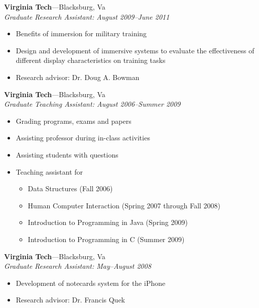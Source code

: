 \documentclass[wideaddress]{vitae}
\newcommand{\ressubitem}[1]{
	\item \begin{flushleft} #1 \end{flushleft}
}
\newcommand{\resbigitem}[3]{
	\item
	\textbf{#1}---#2 \\
	\textit{#3}
}
\newenvironment{ressubsec}[3]{
	\resbigitem{#1}{#2}{#3}
	\begin{itemize}
}{
	\end{itemize}
}
\begin{document}
\begin{description}
	\begin{ressubsec}{Virginia Tech}{Blacksburg, Va}{Graduate Research Assistant: August 2009--June 2011}
		\ressubitem{Benefits of immersion for military training}
		\ressubitem{Design and development of immersive systems to evaluate the effectiveness of different display characteristics on training tasks}
		\ressubitem{Research advisor: Dr. Doug A. Bowman}
	\end{ressubsec}

	\begin{ressubsec}{Virginia Tech}{Blacksburg, Va}{Graduate Teaching Assistant: August 2006--Summer 2009}
		\ressubitem{Grading programs, exams and papers}
		\ressubitem{Assisting professor during in-class activities}
		\ressubitem{Assisting students with questions}
		\ressubitem{Teaching assistant for}
		\begin{itemize}
			\ressubitem{Data Structures (Fall 2006)}
			\ressubitem{Human Computer Interaction (Spring 2007 through Fall 2008)}
			\ressubitem{Introduction to Programming in Java (Spring 2009)}
			\ressubitem{Introduction to Programming in C (Summer 2009)}
		\end{itemize}
	\end{ressubsec}

	\begin{ressubsec}{Virginia Tech}{Blacksburg, Va}{Graduate Research Assistant: May--August 2008}
		\ressubitem{Development of notecards system for the iPhone}
		\ressubitem{Research advisor: Dr. Francis Quek}
	\end{ressubsec}
\end{description}
\end{document}
